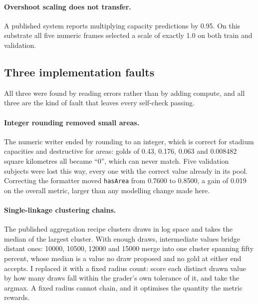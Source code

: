 \documentclass[11pt]{article}
\begin{document}
\paragraph{Overshoot scaling does not transfer.} A published system reports
multiplying capacity predictions by 0.95. On this substrate all five numeric
frames selected a scale of exactly 1.0 on both train and validation.

\subsection{Three implementation faults}

All three were found by reading errors rather than by adding compute, and all
three are the kind of fault that leaves every self-check passing.

\paragraph{Integer rounding removed small areas.} The numeric writer ended by
rounding to an integer, which is correct for stadium capacities and destructive
for areas: golds of 0.43, 0.176, 0.063 and 0.008482 square kilometres all became
``0'', which can never match. Five validation subjects were lost this way, every
one with the correct value already in its pool. Correcting the formatter moved
\texttt{hasArea} from 0.7600 to 0.8500, a gain of 0.019 on the overall metric,
larger than any modelling change made here.

\paragraph{Single-linkage clustering chains.} The published aggregation recipe
clusters draws in log space and takes the median of the largest cluster. With
enough draws, intermediate values bridge distant ones: 10000, 10500, 12000 and
15000 merge into one cluster spanning fifty percent, whose median is a value no
draw proposed and no gold at either end accepts. I replaced it with a fixed
radius count: score each distinct drawn value by how many draws fall within the
grader's own tolerance of it, and take the argmax. A fixed radius cannot chain,
and it optimises the quantity the metric rewards.
\end{document}
